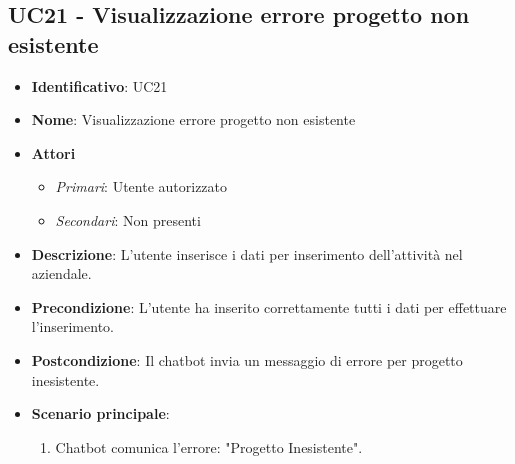 \subsection{UC21 - Visualizzazione errore progetto non esistente}
\begin{itemize}
	\item \textbf{Identificativo}: UC21
	\item \textbf{Nome}: Visualizzazione errore progetto non esistente
	\item \textbf{Attori}
	\begin{itemize} 
		\item \textit{Primari}: Utente autorizzato
		\item \textit{Secondari}: Non presenti
	\end{itemize}
	\item \textbf{Descrizione}: L'utente inserisce i dati per inserimento dell'attività nel  aziendale.
	\item \textbf{Precondizione}: L'utente ha inserito correttamente tutti i dati per effettuare l'inserimento.
	\item \textbf{Postcondizione}: Il chatbot invia un messaggio di errore per progetto inesistente.
	\item \textbf{Scenario principale}: \begin{enumerate}
		\item Chatbot comunica l'errore: "Progetto Inesistente".
	\end{enumerate}
\end{itemize}